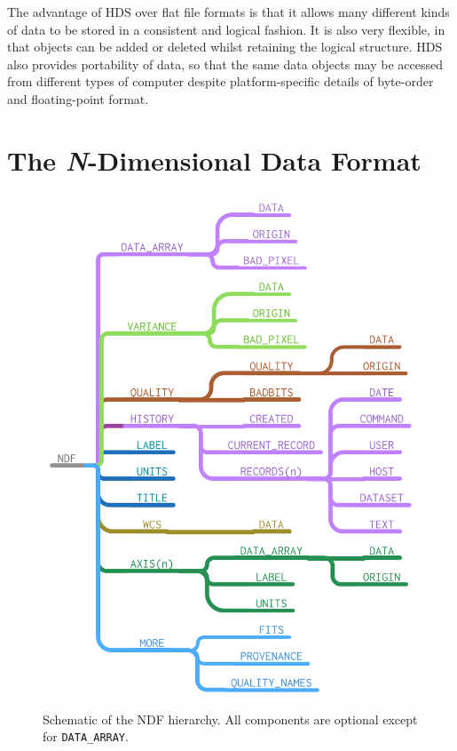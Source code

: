\documentclass[final,authoryear,5p,times,twocolumn]{elsarticle}
\begin{document}
The advantage of HDS over flat file formats is that it allows many different kinds of data to
be stored in a consistent and logical fashion. It is also very
flexible, in that objects can be added or deleted whilst retaining the
logical structure.  HDS also provides portability of data, so that the
same data objects may be accessed from different types of computer
despite platform-specific details of byte-order and floating-point format.

\section{The \emph{N}-Dimensional Data Format}
\label{sec:ndf}

\begin{figure}[t]
\includegraphics[width=\columnwidth]{NDF-structure}
\caption{Schematic of the NDF hierarchy. All components are optional
  except for \texttt{DATA\_ARRAY}.}
\label{fig:ndf-structure}
\end{figure}
\end{document}
